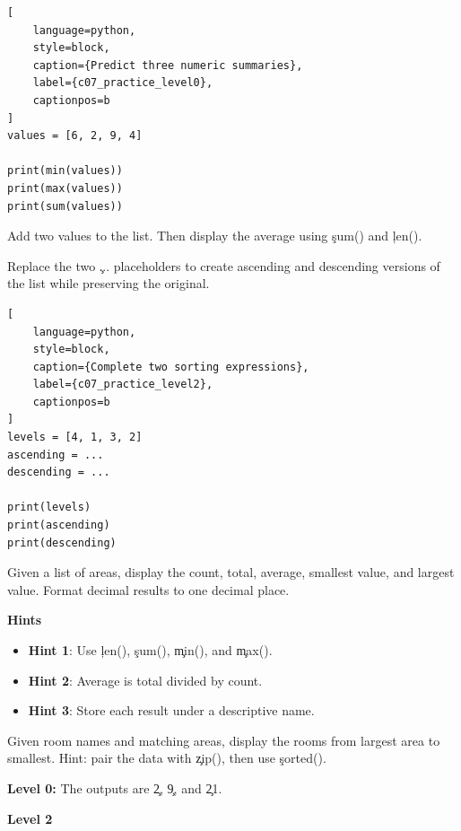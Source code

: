 

\begin{lstlisting}[
    language=python,
    style=block,
    caption={Predict three numeric summaries},
    label={c07_practice_level0},
    captionpos=b
]
values = [6, 2, 9, 4]

print(min(values))
print(max(values))
print(sum(values))
\end{lstlisting}


Add two values to the list. Then display the average using \c{sum()} and
\c{len()}.


Replace the two \c{...} placeholders to create ascending and descending
versions of the list while preserving the original.

\begin{lstlisting}[
    language=python,
    style=block,
    caption={Complete two sorting expressions},
    label={c07_practice_level2},
    captionpos=b
]
levels = [4, 1, 3, 2]
ascending = ...
descending = ...

print(levels)
print(ascending)
print(descending)
\end{lstlisting}


Given a list of areas, display the count, total, average, smallest value, and
largest value. Format decimal results to one decimal place.

\textbf{Hints}
\begin{itemize}
    \item \textbf{Hint 1}: Use \c{len()}, \c{sum()}, \c{min()}, and \c{max()}.
    \item \textbf{Hint 2}: Average is total divided by count.
    \item \textbf{Hint 3}: Store each result under a descriptive name.
\end{itemize}


Given room names and matching areas, display the rooms from largest area to
smallest. Hint: pair the data with \c{zip()}, then use \c{sorted()}.


\textbf{Level 0:} The outputs are \c{2}, \c{9}, and \c{21}.

\textbf{Level 2}

